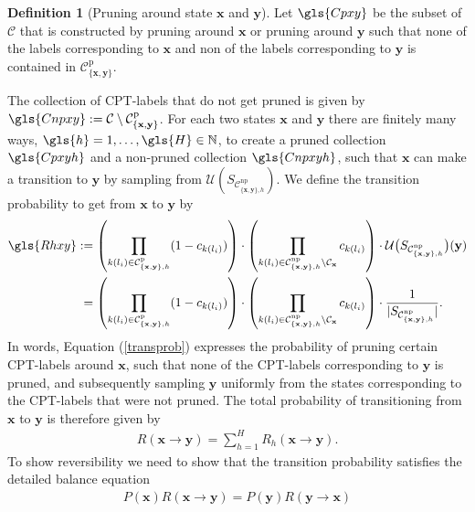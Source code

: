 \documentclass[a4paper, twoside, 11pt]{report}
\newcommand{\bfx}{{\mathbf{x}}}
\newcommand{\C}{{\mathcal C}}
\newcommand{\U}{{\mathcal{U}}}
\theoremstyle{plain}
\theoremstyle{definition}
\newtheorem{definition}[thm]{Definition}
\theoremstyle{remark}
\newcommand{\bfy}{{\mathbf{y}}}
\def\N{{\mathbb N}}
\begin{document}
\begin{definition}[Pruning around state $\bfx$ and $\bfy$]
Let $\gls{Cpxy}$ be the subset of $\mathcal{C}$ that is constructed by pruning around $\mathbf{x}$ or pruning around $\mathbf{y}$ such that none of the labels corresponding to $\mathbf{x}$ and non of the labels corresponding to $\mathbf{y}$ is contained in $\mathcal{C}_{\{\mathbf{x}, \mathbf{y}\}}^{\text{p}}$.
\end{definition}
The collection of CPT-labels that do not get pruned is given by $\gls{Cnpxy} := \C \setminus \mathcal{C}_{\{\mathbf{x}, \mathbf{y}\}}^{\text{p}}$. For each two states $\bfx$ and $\bfy$ there are finitely many ways, $\gls{h} =1,\ldots, \gls{H} \in \N$, to create a pruned collection $\gls{Cpxyh}$ and a non-pruned collection $\gls{Cnpxyh}$, such that $\bfx$ can make a transition to $\bfy$ by sampling from $\U(S_{\C_{\{\bfx, \bfy\},h}^{\text{np}}})$. We define the transition probability to get from $\bfx$ to $\bfy$ by
\begin{align}\label{transprob}
\gls{Rhxy} &:= \left(\prod_{k(l_i) \in \C_{\{\bfx, \bfy\},h}^{\text{p}} } (1-c_{k(l_i)}) \right) \cdot \left( \prod_{k(l_i) \in \C_{\{\bfx, \bfy\},h}^{\text{np}} \setminus \mathcal{C}_{\mathbf{x}}  } c_{k(l_i)}   \right) \cdot \mathcal{U} \big( S_{\C_{\{\bfx, \bfy\},h}^{\text{np}}} \big)(\mathbf{y}) \\ \nonumber
&\;=\left(\prod_{k(l_i) \in \C_{\{\bfx, \bfy\},h}^{\text{p}} } (1-c_{k(l_i)}) \right)\cdot \left( \prod_{k(l_i) \in \C_{\{\bfx, \bfy\},h}^{\text{np}} \setminus \mathcal{C}_{\mathbf{x}}  } c_{k(l_i)}   \right)  \nonumber \cdot \frac{1}{|S_{\C_{\{\bfx, \bfy\},h}^{\text{np}}}|}.
\end{align}
In words, Equation (\ref{transprob}) expresses the probability of pruning certain CPT-labels around $\bfx$, such that none of the CPT-labels corresponding to $\bfy$ is pruned, and subsequently sampling $\bfy$ uniformly from the states corresponding to the CPT-labels that were not pruned. The total probability of transitioning from $\bfx$ to $\bfy$ is therefore given by
\begin{align} \label{total}
{R}(\mathbf{x} \to \mathbf{y}) = \sum_{h=1}^{H} {R}_h (\mathbf{x} \to \mathbf{y}).
\end{align}
To show reversibility we need to show that the transition probability satisfies the detailed balance equation
\begin{align*}
P(\mathbf{x}) R(\mathbf{x} \to \mathbf{y}) = P(\mathbf{y}) R(\mathbf{y} \to \mathbf{x}) 
\end{align*}
\end{document}
